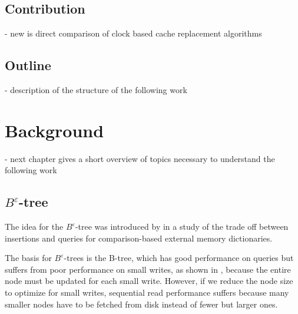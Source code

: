 \documentclass[
	12pt,
	a4paper,
	abstract,
	bibliography=totoc,
	chapterprefix,
	headings=openright,
	numbers=endperiod,
	parskip=half,
	twoside,
]{scrreprt}
\begin{document}
\section{Contribution}
- new is direct comparison of clock based cache replacement algorithms\\

\section{Outline}
- description of the structure of the following work\\


\chapter{Background}
\label{cha:background}


- next chapter gives a short overview of topics necessary to understand the following work\\

\section{$B^{\varepsilon}$-tree}


The idea for the $B^{\varepsilon}$-tree was introduced by \cite{brodal2003lower} in a study of the trade off between insertions and queries for comparison-based external memory dictionaries.

The basis for $B^{\varepsilon}$-trees is the B-tree, which has good performance on queries but suffers from poor performance on small writes, as shown in \cite{bender2015introduction}, 
because the entire node must be updated for each small write.
However, if we reduce the node size to optimize for small writes, sequential read performance suffers because many smaller nodes have to be fetched from disk instead of fewer but larger ones.
\end{document}

